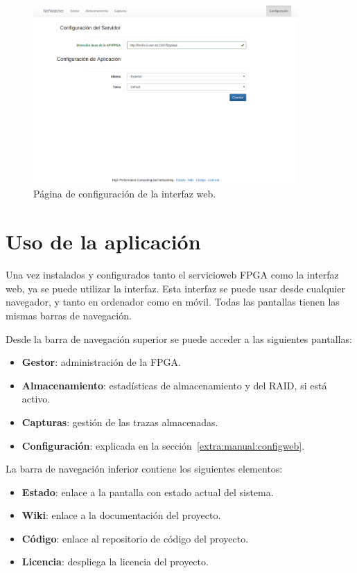 \begin{figure}[!htp]
  \centering
  \includegraphics[width=0.9\textwidth,clip=true]{graphics/capturas/configuracion_tema_base}
  \caption{Página de configuración de la interfaz web.}
  \label{fig:captura:configuracion}
\end{figure}


\section{Uso de la aplicación\label{extra:manual:uso}}
Una vez instalados y configurados tanto el \gls{servicioweb} \gls{FPGA} como la interfaz web, ya se puede utilizar la interfaz.
Esta interfaz se puede usar desde cualquier navegador, y tanto en ordenador como en móvil.
Todas las pantallas tienen las mismas barras de navegación.

Desde la barra de navegación superior se puede acceder a las siguientes pantallas:
\begin{itemize}
  \item \textbf{Gestor}: administración de la \gls{FPGA}.
  \item \textbf{Almacenamiento}: estadísticas de almacenamiento y del \gls{RAID}, si está activo.
  \item \textbf{Capturas}: gestión de las \glspl{traza} almacenadas.
  \item \textbf{Configuración}: explicada en la sección~\ref{extra:manual:configweb}.
\end{itemize}

La barra de navegación inferior contiene los siguientes elementos:
\begin{itemize}
  \item \textbf{Estado}: enlace a la pantalla con estado actual del sistema.
  \item \textbf{Wiki}: enlace a la documentación del proyecto.
  \item \textbf{Código}: enlace al repositorio de código del proyecto.
  \item \textbf{Licencia}: despliega la licencia del proyecto.
\end{itemize}

